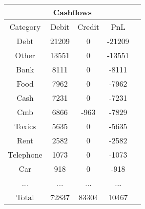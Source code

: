 \begin{longtable}{|c|c|c|c|c|}
\hline
\multicolumn{5}{|c|}{Cashflows} \\
\hline
Category & Debit & Credit & PnL \\
\hline
Debt & 21209 & 0 & -21209\\
\hline
Other & 13551 & 0 & -13551\\
\hline
Bank & 8111 & 0 & -8111\\
\hline
Food & 7962 & 0 & -7962\\
\hline
Cash & 7231 & 0 & -7231\\
\hline
Cmb & 6866 & -963 & -7829\\
\hline
Toxics & 5635 & 0 & -5635\\
\hline
Rent & 2582 & 0 & -2582\\
\hline
Telephone & 1073 & 0 & -1073\\
\hline
Car & 918 & 0 & -918\\
\hline
 ... & ... & ... & ...\\
\hline
 Total & 72837 & 83304 & 10467 \\
\hline
\end{longtable}
